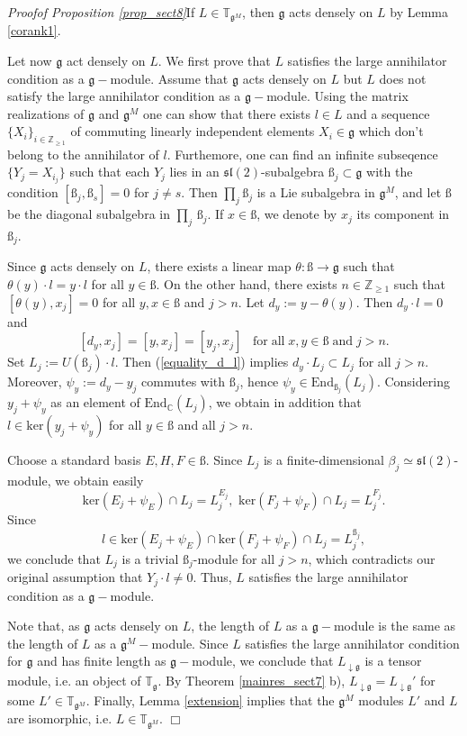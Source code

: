 \documentclass[10pt]{amsart}
\renewenvironment{proof}{ \emph{Proof}}{$\Box$}
\newcommand {\ZZ} {\mathbb {Z}}
\newcommand {\CC} {\mathbb {C}}
\newcommand{\TT}{\mathbb{T}}
\renewcommand{\sl}{\mathfrak{sl}}
\renewcommand{\gg}{\mathfrak{g}}
\newcommand{\Ker}{\mathrm{ker}}
\newcommand{\End}{\mathrm{End}}
\begin{document}
\begin{proof}\textit{of Proposition \ref{prop_sect8}}\hspace{0.2cm}If $L \in \TT_{\gg^M}$, then $\gg$ acts densely on $L$ by Lemma \ref{corank1}. 

Let now $\gg$ act densely on $L$. We first prove that $L$ satisfies the large annihilator condition as a $\gg-$module. 
Assume that $\gg$ acts densely on $L$ but $L$ does not satisfy the large annihilator condition as a $\gg-$module. Using the matrix realizations of $\gg$ and $\gg^M$
one can show that there exists $l\in L$ and a sequence $\lbrace X_i\rbrace_{i\in\ZZ_{\geq 1}}$ of commuting linearly independent elements  $X_i\in\gg$
which don't belong to the annihilator of $l$. Furthemore, 
one can find an infinite subseqence $\lbrace Y_j=X_{i_j} \rbrace$ such that each $Y_j$ lies in an $\sl(2)$-subalgebra
$\text{\ss}_j\subset\gg$ with the condition
$[\text{\ss}_j,\text{\ss}_s]=0$ for $j\neq s$. Then $\prod_j \text{\ss}_j$ is a Lie subalgebra in $\gg^M$, and let $\text{\ss}$ be the diagonal subalgebra in $\prod_j\,\text{\ss}_j$. 
If $x\in\text{\ss}$, we denote by $x_j$ its component in $\text{\ss}_j$.

Since $\gg$ acts densely on $L$, there exists a linear map $\theta:\text{\ss}\to \gg$ such that $\theta(y)\cdot l=y\cdot l$ for all $y\in\text{\ss}$. 
On the other hand, there exists $n \in \ZZ_{\geq 1}$ such that
$[\theta(y),x_j]=0$ for all $y,x\in\text{\ss}$ and $j>n$. Let $d_y:=y-\theta(y)$. Then $d_y\cdot l=0$ and 
\begin{equation}\label{equality_d_l}
[d_y,x_j]=[y,x_j]=[y_j,x_j]\;\;\;\mathrm{for\;all}\;x,y\in\text{\ss}\;\mathrm{and}\;j>n.
\end{equation}           
Set $L_j:=U(\text{\ss}_j)\cdot l$. Then (\ref{equality_d_l}) implies $d_y\cdot L_j \subset L_j$ for all $j>n$.  
Moreover, $\psi_y:=d_y-y_j$ commutes with $\text{\ss}_j$, hence $\psi_y\in\End_{\text{\ss}_j}(L_j)$. 
Considering $y_j + \psi_y$ as an element of $\End_{\CC}(L_j)$, we obtain in addition that $l\in\Ker (y_j+\psi_y)$ for all $y\in\text{\ss}$ and all $j>n$. 

Choose a standard basis $E,H,F\in\text{\ss}$. Since $L_j$ is a finite-dimensional $\beta_j\simeq\sl(2)$-module, 
we obtain easily
$$\Ker(E_j+\psi_E)\cap L_j=L_j^{E_j},\,\, \Ker(F_j+\psi_F)\cap L_j=L_j^{F_j}.$$
Since
$$l \in \Ker(E_j+\psi_E)\cap \Ker(F_j+\psi_F)\cap L_j=L_j^{\text{\ss}_j},$$ 
we conclude that $L_j$ is a trivial  $\text{\ss}_j$-module for all $j>n$, which contradicts our original assumption that $Y_j\cdot l\neq 0$. 
Thus, $L$ satisfies the large annihilator condition as a $\gg-$module.

Note that, as $\gg$ acts densely on $L$, the length of $L$ as a $\gg-$module is the same as the length of $L$ as a $\gg^M-$module. 
Since $L$ satisfies  the large annihilator condition for $\gg$ and has finite length as $\gg-$module, we conclude that $L_{\downarrow\gg}$ is a tensor module, i.e. 
an object of $\TT_\gg$. By Theorem \ref{mainres_sect7} b), $L_{\downarrow\gg} = L_{\downarrow\gg}'$ for some $L' \in \TT_{\gg^M}$. Finally, Lemma \ref{extension} implies that the $\gg^M$ modules $L'$ and $L$ are isomorphic, i.e. $L\in\TT_{\gg^M}$.
\end{proof}
\end{document}
